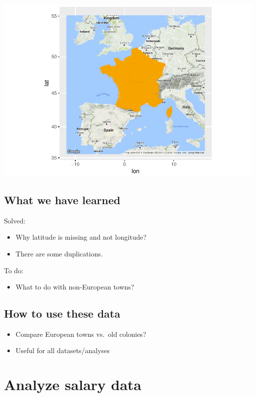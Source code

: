 \documentclass[]{article}
\providecommand{\tightlist}{%
  \setlength{\itemsep}{0pt}\setlength{\parskip}{0pt}}
\begin{document}
\includegraphics{TSLproject_files/figure-latex/unnamed-chunk-11-3.pdf}

\subsection{What we have learned}\label{what-we-have-learned-1}

Solved:

\begin{itemize}
\tightlist
\item
  Why latitude is missing and not longitude?
\item
  There are some duplications.
\end{itemize}

To do:

\begin{itemize}
\tightlist
\item
  What to do with non-European towns?
\end{itemize}

\subsection{How to use these data}\label{how-to-use-these-data-1}

\begin{itemize}
\tightlist
\item
  Compare European towns vs.~old colonies?
\item
  Useful for all datasets/analyses
\end{itemize}

\section{Analyze salary data}\label{analyze-salary-data}
\end{document}
